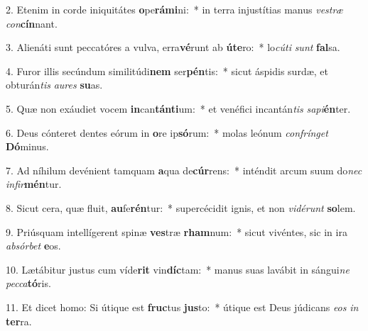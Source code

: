 2. Etenim in corde iniquitátes \textbf{o}pe\textbf{rá}\textbf{mi}ni:~*  in terra injustítias manus \textit{ves}\textit{træ} \textit{con}\textbf{cín}nant.\

3. Alienáti sunt peccatóres a vulva, erra\textbf{vé}runt ab \textbf{ú}\textbf{te}ro:~*  lo\textit{cú}\textit{ti} \textit{sunt} \textbf{fal}sa.\

4. Furor illis secúndum similitúdi\textbf{nem} ser\textbf{pén}tis:~*  sicut áspidis surdæ, et obturán\textit{tis} \textit{au}\textit{res} \textbf{su}as.\

5. Quæ non exáudiet vocem \textbf{in}can\textbf{tán}\textbf{ti}um:~*  et venéfici incantán\textit{tis} \textit{sa}\textit{pi}\textbf{én}ter.\

6. Deus cónteret dentes eórum in \textbf{o}re ip\textbf{só}rum:~*  molas leónum \textit{con}\textit{frín}\textit{get} \textbf{Dó}minus.\

7. Ad níhilum devénient tamquam \textbf{a}qua de\textbf{cúr}rens:~*  inténdit arcum suum do\textit{nec} \textit{in}\textit{fir}\textbf{mén}tur.\

8. Sicut cera, quæ fluit, \textbf{au}fe\textbf{rén}tur:~*  supercécidit ignis, et non \textit{vi}\textit{dé}\textit{runt} \textbf{so}lem.\

9. Priúsquam intellígerent spinæ \textbf{ves}træ \textbf{rham}num:~*  sicut vivéntes, sic in ira \textit{ab}\textit{sór}\textit{bet} \textbf{e}os.\

10. Lætábitur justus cum víde\textbf{rit} vin\textbf{díc}tam:~*  manus suas lavábit in sángui\textit{ne} \textit{pec}\textit{ca}\textbf{tó}ris.\

11. Et dicet homo: Si útique est \textbf{fruc}tus \textbf{jus}to:~*  útique est Deus júdicans \textit{e}\textit{os} \textit{in} \textbf{ter}ra.\

